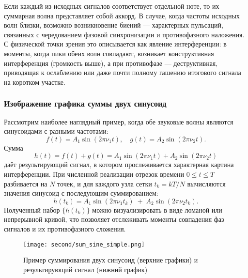 \documentclass[bachelor, och, diploma]{SCWorks}
\begin{document}
Если каждый из исходных сигналов соответствует отдельной ноте, то их суммарная волна представляет собой аккорд. В случае, когда частоты исходных волн близки, возможно возникновение биений --- характерных пульсаций, связанных с чередованием фазовой синхронизации и противофазного наложения. С физической точки зрения это описывается как явление интерференции: в моменты, когда пики обеих волн совпадают, возникает конструктивная интерференция (громкость выше), а при противофазе --- деструктивная, приводящая к ослаблению или даже почти полному гашению итогового сигнала на коротком участке.



\subsubsection{Изображение графика суммы двух синусоид}
Рассмотрим наиболее наглядный пример, когда обе звуковые волны являются синусоидами с разными частотами:
\[
f(t) = A_1 \sin(2\pi \nu_1 t), 
\quad
g(t) = A_2 \sin(2\pi \nu_2 t).
\]
Сумма
\[
h(t) = f(t) + g(t) = A_1 \sin(2\pi \nu_1 t) + A_2 \sin(2\pi \nu_2 t)
\]
даёт результирующий сигнал, в котором прослеживается характерная картина интерференции. При численной реализации отрезок времени \(0 \le t \le T\) разбивается на \(N\) точек, и для каждого узла сетки \(t_k = kT/N\) вычисляются значения синусоид с последующим суммированием:
\[
h(t_k) = A_1 \sin(2\pi \nu_1 t_k) \;+\; A_2 \sin(2\pi \nu_2 t_k).
\]
Полученный набор \(\{h(t_k)\}\) можно визуализировать в виде ломаной или непрерывной кривой, что позволяет отслеживать моменты совпадения фаз сигналов и их противофазного сложения.

\begin{figure}[h!]
\centering
\texttt{[image: second/sum\_sine\_simple.png]}
\caption{Пример суммирования двух синусоид (верхние графики) и результирующий сигнал (нижний график)}
\label{fig:sum_sine_signals}
\end{figure}
\end{document}
